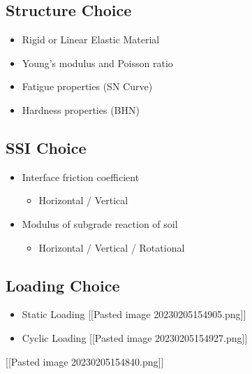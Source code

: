 \documentclass[
  letterpaper,
  DIV=11,
  numbers=noendperiod]{scrreprt}
\providecommand{\tightlist}{%
  \setlength{\itemsep}{0pt}\setlength{\parskip}{0pt}}\usepackage{longtable,booktabs,array}
\begin{document}
\hypertarget{structure-choice}{%
\subsection{Structure Choice}\label{structure-choice}}

\begin{itemize}
\tightlist
\item
  Rigid or Linear Elastic Material
\item
  Young's modulus and Poisson ratio
\item
  Fatigue properties (SN Curve)
\item
  Hardness properties (BHN)
\end{itemize}

\hypertarget{ssi-choice}{%
\subsection{SSI Choice}\label{ssi-choice}}

\begin{itemize}
\tightlist
\item
  Interface friction coefficient

  \begin{itemize}
  \tightlist
  \item
    Horizontal / Vertical
  \end{itemize}
\item
  Modulus of subgrade reaction of soil

  \begin{itemize}
  \tightlist
  \item
    Horizontal / Vertical / Rotational
  \end{itemize}
\end{itemize}

\hypertarget{loading-choice}{%
\subsection{Loading Choice}\label{loading-choice}}

\begin{itemize}
\tightlist
\item
  Static Loading {[}{[}Pasted image 20230205154905.png{]}{]}
\item
  Cyclic Loading {[}{[}Pasted image 20230205154927.png{]}{]}
\end{itemize}

{[}{[}Pasted image 20230205154840.png{]}{]}
\end{document}
